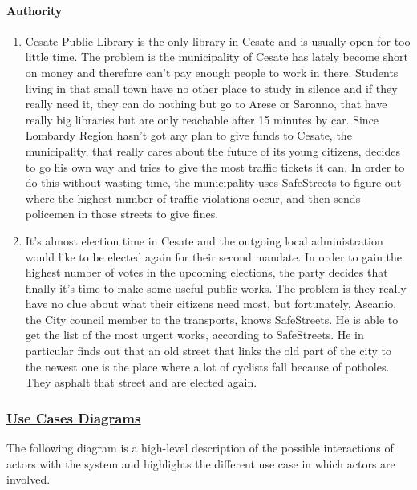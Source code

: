 		\paragraph{Authority}
		\begin{enumerate}
			\item \label{sce:basicAuthority} Cesate Public Library is the only library in Cesate and is usually open for too little time. The problem is the municipality of Cesate has lately become short on money and therefore can’t pay enough people to work in there. Students living in that small town have no other place to study in silence and if they really need it, they can do nothing but go to Arese or Saronno, that have really big libraries but are only reachable after 15 minutes by car. Since Lombardy Region hasn’t got any plan to give funds to Cesate, the municipality, that really cares about the future of its young citizens, decides to go his own way and tries to give the most traffic tickets it can. In order to do this without wasting time, the municipality uses SafeStreets to figure out where the highest number of traffic violations occur, and then sends policemen in those streets to give fines.
			
			\item \label{sce:advancedAuthority} It’s almost election time in Cesate and the outgoing local administration would like to be elected again for their second mandate. In order to gain the highest number of votes in the upcoming elections, the party decides that finally it’s time to make some useful public works. The problem is they really have no clue about what their citizens need most, but fortunately, Ascanio, the City council member to the transports, knows SafeStreets. He is able to get the list of the most urgent works, according to SafeStreets. He in particular finds out that an old street that links the old part of the city to the newest one is the place where a lot of cyclists fall because of potholes. They asphalt that street and are elected again.
		\end{enumerate}
		
	\subsubsection[Use Cases Diagrams]{\hyperlink{toc}{Use Cases Diagrams}}
		The following diagram is a high-level description of the possible interactions of actors with the system and highlights the different use case in which actors are involved.
		
